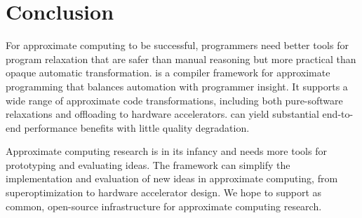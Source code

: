 \section{Conclusion}

For approximate computing to be successful,
programmers need better tools for program relaxation that are safer than
manual reasoning but more practical than opaque automatic transformation.
\sysname is a compiler framework for approximate programming that
balances automation with programmer insight.
It supports a wide range of approximate code transformations, including
both pure-software relaxations and offloading to hardware accelerators.
\sysname can yield substantial
end-to-end performance benefits with little quality degradation.

Approximate computing research is in its infancy and needs more tools for
prototyping and evaluating ideas.
The \sysname framework can simplify the implementation and evaluation of new
ideas in approximate computing, from superoptimization to hardware accelerator
design.
We hope to support \sysname as common, open-source infrastructure for
approximate computing research.
